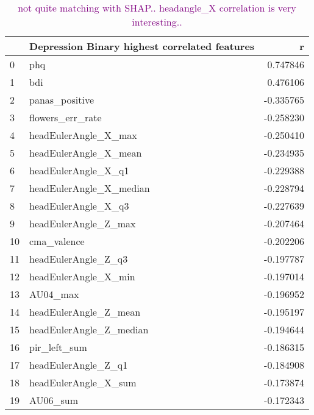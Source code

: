 \begin{table}
\caption{\textcolor{purple}{not quite matching with SHAP.. headangle\_X correlation is very interesting.. }}
\begin{tabular}{llr}
\toprule
{} & Depression Binary highest correlated features &         r \\
\midrule
0  &                      phq &  0.747846 \\
1  &                      bdi &  0.476106 \\
2  &           panas\_positive & -0.335765 \\
3  &         flowers\_err\_rate & -0.258230 \\
4  &     headEulerAngle\_X\_max & -0.250410 \\
5  &    headEulerAngle\_X\_mean & -0.234935 \\
6  &      headEulerAngle\_X\_q1 & -0.229388 \\
7  &  headEulerAngle\_X\_median & -0.228794 \\
8  &      headEulerAngle\_X\_q3 & -0.227639 \\
9  &     headEulerAngle\_Z\_max & -0.207464 \\
10 &              cma\_valence & -0.202206 \\
11 &      headEulerAngle\_Z\_q3 & -0.197787 \\
12 &     headEulerAngle\_X\_min & -0.197014 \\
13 &                 AU04\_max & -0.196952 \\
14 &    headEulerAngle\_Z\_mean & -0.195197 \\
15 &  headEulerAngle\_Z\_median & -0.194644 \\
16 &             pir\_left\_sum & -0.186315 \\
17 &      headEulerAngle\_Z\_q1 & -0.184908 \\
18 &     headEulerAngle\_X\_sum & -0.173874 \\
19 &                 AU06\_sum & -0.172343 \\
\bottomrule
\end{tabular}
\end{table}




